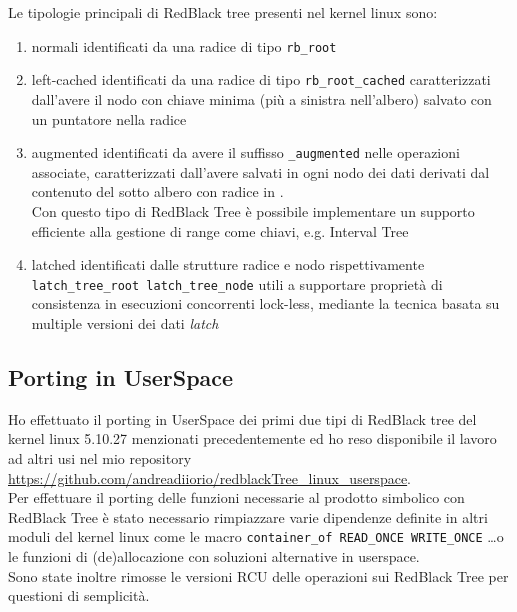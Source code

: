\voidLine
Le tipologie principali di RedBlack tree presenti nel kernel linux sono:	\label{linuxRBTree_}
\begin{enumerate}
	\item normali  		identificati da una radice di tipo \verb|rb_root|
	\item left-cached 	identificati da una radice di tipo \verb|rb_root_cached|
		caratterizzati dall'avere il nodo con chiave minima (più a sinistra nell'albero) salvato con un puntatore nella radice
	\item augmented		identificati da avere il suffisso \verb|_augmented| nelle operazioni associate,
		caratterizzati dall'avere salvati in ogni nodo  dei dati derivati dal contenuto del sotto albero con radice in .\\
		Con questo tipo di RedBlack Tree è possibile implementare un supporto efficiente alla gestione di range come chiavi,
		e.g. Interval Tree \cite{rbtree.rst,algoIntro}
	\item latched		identificati dalle strutture radice e nodo rispettivamente \verb|latch_tree_root latch_tree_node|
		utili a supportare proprietà di consistenza in esecuzioni concorrenti lock-less,
		mediante la tecnica basata su multiple versioni dei dati \emph{latch}
\end{enumerate}

\subsection{Porting in UserSpace} 
Ho effettuato il porting in UserSpace dei primi due tipi di RedBlack tree del kernel linux 5.10.27 menzionati precedentemente 
ed ho reso disponibile il lavoro ad altri usi nel mio repository \url{https://github.com/andreadiiorio/redblackTree_linux_userspace}.\\
Per effettuare il porting delle funzioni necessarie al prodotto simbolico con RedBlack Tree è stato necessario 
rimpiazzare varie dipendenze definite in altri moduli del kernel linux come 
le macro \verb|container_of READ_ONCE WRITE_ONCE| \dots  o le funzioni di (de)allocazione
con soluzioni alternative in userspace.\\Sono state inoltre rimosse le versioni RCU delle operazioni sui RedBlack Tree per questioni di semplicità. 

